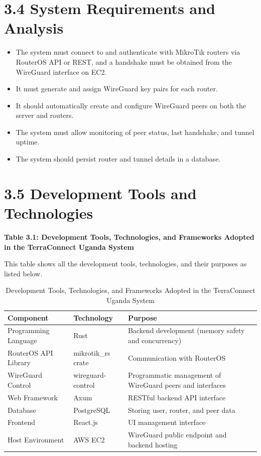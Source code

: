 \documentclass[12pt,a4paper,oneside]{report}
\begin{document}
\section{3.4 System Requirements and Analysis}

\begin{itemize}
  \item The system must connect to and authenticate with MikroTik routers via RouterOS API or REST, and a handshake must be obtained from the WireGuard interface on EC2.
  \item It must generate and assign WireGuard key pairs for each router.
  \item It should automatically create and configure WireGuard peers on both the server and routers.
  \item The system must allow monitoring of peer status, last handshake, and tunnel uptime.
  \item The system should persist router and tunnel details in a database.
\end{itemize}

\section{3.5 Development Tools and Technologies}

\textbf{Table 3.1: Development Tools, Technologies, and Frameworks Adopted in the TerraConnect Uganda System}

\vspace{0.3cm}
This table shows all the development tools, technologies, and their purposes as listed below.

\begin{table}[htbp]
  \centering
  \caption{Development Tools, Technologies, and Frameworks Adopted in the TerraConnect Uganda System}
  {\small
  \begin{tabular}{|p{3.44cm}|p{2.82cm}|p{8.00cm}|}
    \hline
    \textbf{Component} & \textbf{Technology} & \textbf{Purpose} \\
    \hline
    Programming Language & Rust & Backend development (memory safety and concurrency) \\
    RouterOS API Library & mikrotik\_rs crate & Communication with RouterOS \\
    WireGuard Control & wireguard-control & Programmatic management of WireGuard peers and interfaces \\
    Web Framework & Axum & RESTful backend API interface \\
    Database & PostgreSQL & Storing user, router, and peer data \\
    Frontend & React.js & UI management interface \\
    Host Environment & AWS EC2 & WireGuard public endpoint and backend hosting \\
    \hline
  \end{tabular}
  }
\end{table}
\end{document}
